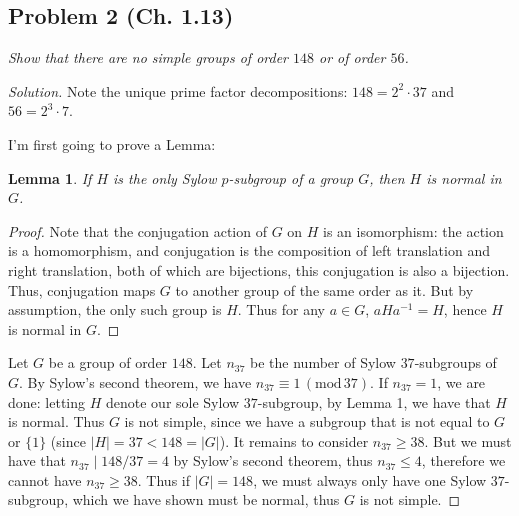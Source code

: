 \documentclass{article}
\newtheorem{lemma}{Lemma}
\begin{document}
\subsection*{Problem 2 (Ch. 1.13)}
{\it Show that there are no simple groups of order $148$ or of order $56$.}
\begin{proof}[Solution]\let\qed\relax
	Note the unique prime factor decompositions: $148 = 2^2\cdot 37$
	and $56 = 2^3\cdot 7$.

	I'm first going to prove a Lemma:
	\begin{lemma}
		If $H$ is the only Sylow $p$-subgroup of a group $G$,
		then $H$ is normal in $G$.
	\end{lemma}
	\begin{proof}
		Note that the conjugation action of $G$ on $H$ is an isomorphism:
		the action is a homomorphism,
		and conjugation is the composition of left translation and right translation,
		both of which are bijections,
		this conjugation is also a bijection.
		Thus, conjugation maps $G$ to another group of the same order as it.
		But by assumption, the only such group is $H$.
		Thus for any $a \in G$, $aHa^{-1} = H$,
		hence $H$ is normal in $G$.
	\end{proof}
	
	Let $G$ be a group of order $148$.
	Let $n_{37}$ be the number of Sylow $37$-subgroups of $G$.
	By Sylow's second theorem, we have $n_{37} \equiv 1\, (\mathrm{mod}\, 37)$.
	If $n_{37} = 1$, we are done:
	letting $H$ denote our sole Sylow $37$-subgroup,
	by Lemma 1, we have that $H$ is normal.
	Thus $G$ is not simple, since we have a subgroup
	that is not equal to $G$ or $\{1\}$ (since $|H| = 37 < 148 = |G|$).
	It remains to consider $n_{37} \geq 38$.
	But we must have that $n_{37} \mid 148/37 = 4$ by Sylow's second theorem,
	thus $n_{37} \leq 4$, therefore we cannot have $n_{37} \geq 38$.
	Thus if $|G| = 148$, we must always only have one Sylow $37$-subgroup,
	which we have shown must be normal, thus $G$ is not simple.


\end{proof}
\end{document}
